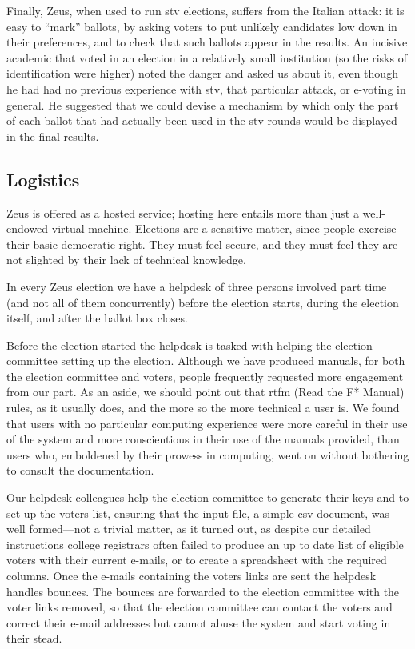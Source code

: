 \documentclass[letterpaper,10pt]{article}
\begin{document}
Finally, Zeus, when used to run {\sc stv} elections, suffers from the
Italian attack: it is easy to ``mark'' ballots, by asking voters to
put unlikely candidates low down in their preferences, and to check
that such ballots appear in the results. An incisive academic that
voted in an election in a relatively small institution (so the risks
of identification were higher) noted the danger and asked us about it,
even though he had had no previous experience with {\sc stv}, that
particular attack, or e-voting in general. He suggested that we could
devise a mechanism by which only the part of each ballot that had
actually been used in the {\sc stv} rounds would be displayed in the
final results. 

\subsection{Logistics}
\label{ssec:logistics}

Zeus is offered as a hosted service; hosting here entails more than
just a well-endowed virtual machine. Elections are a sensitive matter,
since people exercise their basic democratic right. They must feel
secure, and they must feel they are not slighted by their lack of
technical knowledge.

In every Zeus election we have a helpdesk of three persons involved
part time (and not all of them concurrently) before the election
starts, during the election itself, and after the ballot box closes.

Before the election started the helpdesk is tasked with helping the
election committee setting up the election. Although we have produced
manuals, for both the election committee and voters, people frequently
requested more engagement from our part. As an aside, we should point
out that {\sc rtfm} (Read the F* Manual) rules, as it usually does,
and the more so the more technical a user is. We found that users with
no particular computing experience were more careful in their use of
the system and more conscientious in their use of the manuals
provided, than users who, emboldened by their prowess in computing,
went on without bothering to consult the documentation.

Our helpdesk colleagues help the election committee to generate
their keys and to set up the voters list, ensuring that the input
file, a simple {\sc csv} document, was well formed---not a trivial
matter, as it turned out, as despite our detailed instructions college
registrars often failed to produce an up to date list of eligible
voters with their current e-mails, or to create a spreadsheet with the
required columns. Once the e-mails containing the
voters links are sent the helpdesk handles bounces. The bounces
are forwarded to the election committee with the voter links removed,
so that the election committee can contact the voters and correct
their e-mail addresses but cannot abuse the system and start voting in
their stead. 
\end{document}
